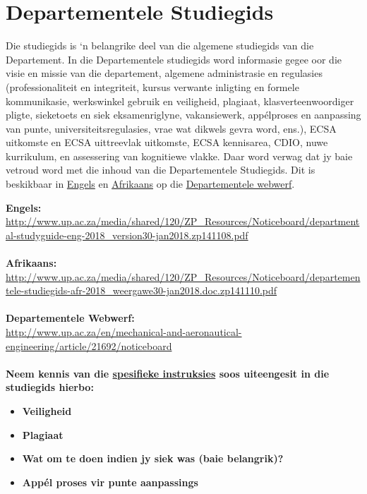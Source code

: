 \section{Departementele Studiegids}\label{sec:department}
    Die studiegids is `n belangrike deel van die algemene studiegids van die
    Departement. In die Departementele studiegids word informasie gegee oor die
    visie en missie van die departement, algemene administrasie en regulasies
    (professionaliteit en integriteit, kursus verwante inligting en formele
    kommunikasie, werkswinkel gebruik en veiligheid, plagiaat,
    klasverteenwoordiger pligte, sieketoets en siek eksamenriglyne,
    vakansiewerk, app\'{e}lproses en aanpassing van punte,
    universiteitsregulasies, vrae wat dikwels gevra word, ens.), ECSA uitkomste
    en ECSA uittreevlak uitkomste, ECSA kennisarea, CDIO, nuwe kurrikulum, en
    assessering van kognitiewe vlakke.  Daar word verwag dat jy baie vetroud
    word met die inhoud van die Departementele Studiegids. Dit is beskikbaar
    in
    \href{http://www.up.ac.za/media/shared/120/ZP_Resources/Noticeboard/departmental-studyguide-eng-2018_version30-jan2018.zp141108.pdf}{Engels}
    en
    \href{http://www.up.ac.za/media/shared/120/ZP_Resources/Noticeboard/departementele-studiegids-afr-2018_weergawe30-jan2018.doc.zp141110.pdf}{Afrikaans}
    op die
    \href{http://www.up.ac.za/en/mechanical-and-aeronautical-engineering/article/21692/noticeboard}{Departementele webwerf}.

    \noindent
    \textbf{Engels:} \\
    \url{http://www.up.ac.za/media/shared/120/ZP_Resources/Noticeboard/departmental-studyguide-eng-2018_version30-jan2018.zp141108.pdf} \\~\\
    \textbf{Afrikaans:} \\
    \url{http://www.up.ac.za/media/shared/120/ZP_Resources/Noticeboard/departementele-studiegids-afr-2018_weergawe30-jan2018.doc.zp141110.pdf} \\~\\
    \textbf{Departementele Webwerf:} \\
    \url{http://www.up.ac.za/en/mechanical-and-aeronautical-engineering/article/21692/noticeboard} \\~\\

    \noindent
    \textbf{Neem kennis van die \uline{spesifieke instruksies} soos uiteengesit
    in die studiegids hierbo:}
    \begin{itemize}
        \item \textbf{Veiligheid}
        \item \textbf{Plagiaat}
        \item \textbf{Wat om te doen indien jy siek was (baie belangrik)?}
        \item \textbf{App\'el proses vir punte aanpassings}
    \end{itemize}

